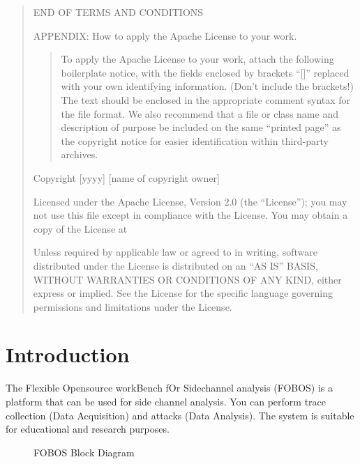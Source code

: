 \documentclass[letterpaper,10pt,english]{sphinxmanual}
\begin{document}
\begin{quote}
\begin{enumerate}
\end{enumerate}

END OF TERMS AND CONDITIONS

APPENDIX: How to apply the Apache License to your work.
\begin{quote}

To apply the Apache License to your work, attach the following
boilerplate notice, with the fields enclosed by brackets “{[}{]}”
replaced with your own identifying information. (Don’t include
the brackets!)  The text should be enclosed in the appropriate
comment syntax for the file format. We also recommend that a
file or class name and description of purpose be included on the
same “printed page” as the copyright notice for easier
identification within third-party archives.
\end{quote}

Copyright {[}yyyy{]} {[}name of copyright owner{]}

Licensed under the Apache License, Version 2.0 (the “License”);
you may not use this file except in compliance with the License.
You may obtain a copy of the License at
\begin{quote}

\end{quote}

Unless required by applicable law or agreed to in writing, software
distributed under the License is distributed on an “AS IS” BASIS,
WITHOUT WARRANTIES OR CONDITIONS OF ANY KIND, either express or implied.
See the License for the specific language governing permissions and
limitations under the License.
\end{quote}


\chapter{Introduction}
\label{\detokenize{introduction:introduction}}\label{\detokenize{introduction::doc}}
The Flexible Opensource workBench fOr Sidechannel analysis (FOBOS) is a platform that
can be used for side channel analysis.
You can perform trace collection (Data Acquisition) and attacks (Data Analysis).
The system is suitable for educational and research purposes.

\begin{figure}[htbp]
\centering
\capstart

\noindent{}
\caption{FOBOS Block Diagram}\label{\detokenize{introduction:id1}}\end{figure}
\end{document}
